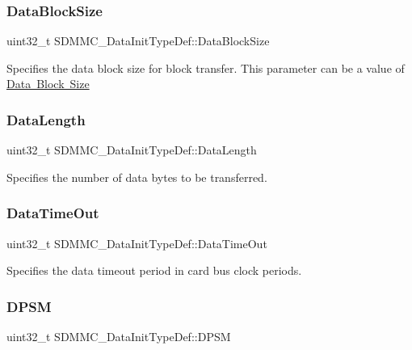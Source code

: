 \subsubsection{\texorpdfstring{DataBlockSize}{DataBlockSize}}
{\footnotesize\ttfamily uint32\+\_\+t S\+D\+M\+M\+C\+\_\+\+Data\+Init\+Type\+Def\+::\+Data\+Block\+Size}

Specifies the data block size for block transfer. This parameter can be a value of \mbox{\hyperlink{group___s_d_m_m_c___l_l___data___block___size}{Data Block Size}} \mbox{\label{struct_s_d_m_m_c___data_init_type_def_a99928f6dd559ef244c4b8642b4ab0fee}} 
\subsubsection{\texorpdfstring{DataLength}{DataLength}}
{\footnotesize\ttfamily uint32\+\_\+t S\+D\+M\+M\+C\+\_\+\+Data\+Init\+Type\+Def\+::\+Data\+Length}

Specifies the number of data bytes to be transferred. \mbox{\label{struct_s_d_m_m_c___data_init_type_def_a33e216962a7e7eb09d4bbccc3d570a80}} 
\subsubsection{\texorpdfstring{DataTimeOut}{DataTimeOut}}
{\footnotesize\ttfamily uint32\+\_\+t S\+D\+M\+M\+C\+\_\+\+Data\+Init\+Type\+Def\+::\+Data\+Time\+Out}

Specifies the data timeout period in card bus clock periods. \mbox{\label{struct_s_d_m_m_c___data_init_type_def_a18c3531154bb359cacd475852da8cd12}} 
\subsubsection{\texorpdfstring{DPSM}{DPSM}}
{\footnotesize\ttfamily uint32\+\_\+t S\+D\+M\+M\+C\+\_\+\+Data\+Init\+Type\+Def\+::\+D\+P\+SM}

